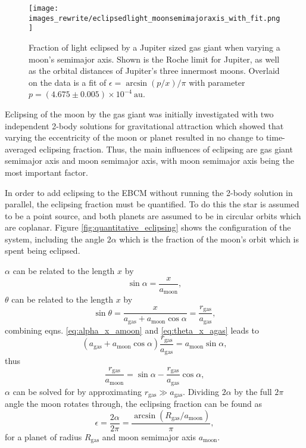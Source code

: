 \documentclass[12pt, onecolumn]{revtex4-2}    %
\begin{document}
\begin{figure}
  \texttt{[image: images\_rewrite/eclipsedlight\_moonsemimajoraxis\_with\_fit.png]}
  \caption{
    Fraction of light eclipsed by a Jupiter sized gas giant when varying a moon's semimajor axis.
    Shown is the Roche limit for Jupiter, as well as the orbital distances of Jupiter's three innermost moons.
    Overlaid on the data is a fit of $\epsilon = \arcsin(p/x)/\pi$ with parameter $p = (4.675\pm0.005)\times 10^{-4}\ \text{au}$.
  }
  \label{fig:quantitative_eclipsing_moon_semimajor_axis}
\end{figure}

Eclipsing of the moon by the gas giant was initially investigated with two independent 2-body solutions for gravitational attraction which showed that varying the eccentricity of the moon or planet resulted in no change to time-averaged eclipsing fraction.
Thus, the main influences of eclipsing are gas giant semimajor axis and moon semimajor axis, with moon semimajor axis being the most important factor.

In order to add eclipsing to the EBCM without running the 2-body solution in parallel, the eclipsing fraction must be quantified.
To do this the star is assumed to be a point source, and both planets are assumed to be in circular orbits which are coplanar.
Figure \ref{fig:quantitative_eclipsing} shows the configuration of the system, including the angle $2\alpha$ which is the fraction of the moon's orbit which is spent being eclipsed.

$\alpha$ can be related to the length $x$ by
\begin{equation}
  \sin \alpha = \frac{x}{a_\text{moon}}, \label{eq:alpha_x_amoon}
\end{equation}
$\theta$ can be related to the length $x$ by
\begin{equation}
  \sin \theta = \frac{x}{a_\text{gas} + a_\text{moon} \cos\alpha} = \frac{r_\text{gas}}{a_\text{gas}} , \label{eq:theta_x_agas}
\end{equation}
combining eqns. \eqref{eq:alpha_x_amoon} and \eqref{eq:theta_x_agas} leads to
\begin{equation}
  (a_\text{gas} + a_\text{moon}\cos\alpha) \frac{r_\text{gas}}{a_\text{gas}} = a_\text{moon} \sin\alpha,
\end{equation}
thus
\begin{equation}
  \frac{r_\text{gas}}{a_\text{moon}} = \sin\alpha - \frac{r_\text{gas}}{a_\text{gas}}\cos\alpha,
\end{equation}
$\alpha$ can be solved for by approximating $r_\text{gas} \gg a_\text{gas}$.
Dividing $2\alpha$ by the full $2\pi$ angle the moon rotates through, the eclipsing fraction can be found as
\begin{equation}
  \epsilon = \frac{2\alpha}{2\pi} = \frac{\arcsin(R_\text{gas} / a_\text{moon})}{\pi},
  \label{eq:eclipsing_fraction}
\end{equation}
for a planet of radius $R_\text{gas}$ and moon semimajor axis $a_\text{moon}$.
\end{document}
